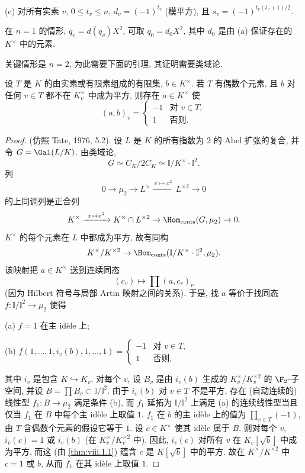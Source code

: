 (c) 对所有实素 $v$, $0\le t_v\le n$, $d_v=(-1)^{t_v}$ (模平方), 且 $s_v=(-1)^{t_v(t_v+1)/2}$.

在 $n=1$ 的情形, $q_v=d(q_v)X^{2}$, 可取 $q_0=d_0X^{2}$, 其中 $d_0$ 是由 (a) 保证存在的 $K^{\times}$ 中的元素.

关键情形是 $n=2$, 为此需要下面的引理, 其证明需要类域论.

\begin{lemma}\label{lem:viii.6.13}
设 $T$ 是 $K$ 的由实素或有限素组成的有限集, $b\in K^{\times}$. 若 $T$ 有偶数个元素, 且 $b$ 对任何 $v\in T$ 都不在 $K_v^{\times}$ 中成为平方, 则存在 $a\in K^{\times}$ 使
\[
(a,b)_{v}=
\begin{cases}
-1 & \text{对 } v\in T,\\
1 & \text{否则.}
\end{cases}
\]
\end{lemma}

\begin{proof}
(仿照 Tate, 1976, 5.2). 设 $L$ 是 $K$ 的所有指数为 $2$ 的 Abel 扩张的复合, 并令 $G=\Gal(L/K)$. 由类域论,
\[
G\simeq C_{K}/2C_{K}\simeq\mathbb{I}/K^{\times}\cdot\mathbb{I}^{2}.
\]
列
\[
0\to\mu_{2}\to L^{\times}\xrightarrow{\ x\mapsto x^{2}\ }L^{\times 2}\to0
\]
的上同调列是正合列
\[
K^{\times}\xrightarrow{\ x\mapsto x^{2}\ }K^{\times}\cap L^{\times 2}\to\Hom_{\mathrm{conts}}(G,\mu_{2})\to0.
\]
$K^{\times}$ 的每个元素在 $L$ 中都成为平方, 故有同构
\[
K^{\times}/K^{\times 2}\to\Hom_{\mathrm{conts}}(\mathbb{I}/K^{\times}\cdot\mathbb{I}^{2},\mu_{2}).
\]
该映射把 $a\in K^{\times}$ 送到连续同态
\[
(c_{v})\mapsto\prod(a,c_{v})_{v}
\]
(因为 Hilbert 符号与局部 Artin 映射之间的关系). 于是, 找 $a$ 等价于找同态 $f\colon\mathbb{I}/\mathbb{I}^{2}\to\mu_2$ 使得

(a) $f=1$ 在主 idèle 上;

(b) $f(1,\ldots,1,i_{v}(b),1,\ldots,1)=
\begin{cases}
-1 & \text{对 } v\in T,\\
1 & \text{否则,}
\end{cases}$

其中 $i_v$ 是包含 $K\hookrightarrow K_v$. 对每个 $v$, 设 $B_v$ 是由 $i_v(b)$ 生成的 $K_v^{\times}/K_v^{\times 2}$ 的 $\F_2$-子空间, 并设 $B=\prod B_v\subset\mathbb{I}/\mathbb{I}^{2}$. 由于 $i_v(b)$ 对 $v\in T$ 不是平方, 存在 (自动连续的) 线性型 $f_1\colon B\to\mu_2$ 满足条件 (b), 而 $f_1$ 延拓为 $\mathbb{I}/\mathbb{I}^{2}$ 上满足 (a) 的连续线性型当且仅当 $f_1$ 在 $B$ 中每个主 idèle 上取值 $1$. $f_1$ 在 $b$ 的主 idèle 上的值为 $\prod_{v\in T}(-1)$, 由 $T$ 含偶数个元素的假设它等于 $1$. 设 $c\in K^{\times}$ 使其 idèle 属于 $B$. 则对每个 $v$, $i_v(c)=1$ 或 $i_v(b)$ (在 $K_v^{\times}/K_v^{\times 2}$ 中). 因此, $i_v(c)$ 对所有 $v$ 在 $K_v[\sqrt{b}]$ 中成为平方, 而这 (由 \ref{thm:viii.1.1}) 蕴含 $c$ 是 $K[\sqrt{b}]$ 中的平方. 故在 $K^{\times}/K^{\times 2}$ 中 $c=1$ 或 $b$, 从而 $f_1$ 在其 idèle 上取值 $1$.
\end{proof}

